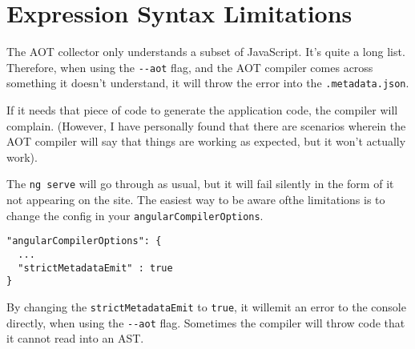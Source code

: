 \section{Expression Syntax Limitations}
The AOT collector only understands a subset of JavaScript. It's quite a long list. Therefore, when using the \lstinline{--aot} flag, and the AOT compiler comes across something it doesn't understand, it will throw the error into the \lstinline{.metadata.json}. 

If it needs that piece of code to generate the application code, the compiler will complain. (However, I have personally found that there are scenarios wherein the AOT compiler will say that things are working as expected, but it won't actually work). 

The \lstinline{ng serve} will go through as usual, but it will fail silently in the form of it not appearing on the site. The easiest way to be aware ofthe limitations is to change the config in your \lstinline{angularCompilerOptions}. 

\begin{lstlisting}
"angularCompilerOptions": {
  ...
  "strictMetadataEmit" : true
}  
\end{lstlisting}

By changing the \lstinline{strictMetadataEmit} to \lstinline{true}, it willemit an error to the console directly, when using the \lstinline{--aot} flag. Sometimes the compiler will throw code that it cannot read into an AST. 